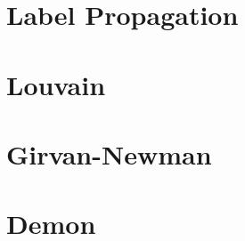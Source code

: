 \section{Label Propagation} %
\label{sec:label_propagation}


\section{Louvain} %
\label{sec:louvain}


\section{Girvan-Newman} %
\label{sec:girvan_newman}


\section{Demon} %
\label{sec:demon}

